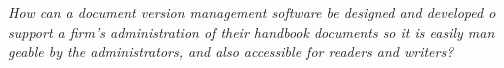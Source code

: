\begin{center}
\textit{How can a document version management software be designed and developed
o support a firm's administration of their handbook documents so it is easily man
geable by the administrators, and also accessible for readers and writers?}
\end{center}
